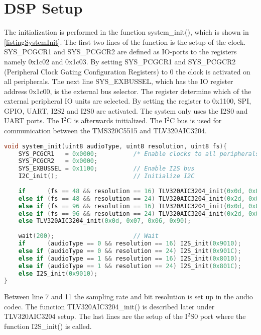 \chapter{DSP Setup} \label{app:DSPSetup}

The initialization is performed in the function system\_init(), which is shown in \autoref{listingSystemInit}. The first two lines of the function is the setup of the clock. SYS\_PCGCR1 and SYS\_PCGCR2 are defined as IO-ports to the registers namely 0x1c02 and 0x1c03. By setting SYS\_PCGCR1 and SYS\_PCGCR2 (Peripheral Clock Gating Configuration Registers) to 0 the clock is activated on all peripherals. The next line SYS\_EXBUSSEL, which has the IO register address 0x1c00, is the external bus selector. The register determine which of the external peripheral IO units are selected. By setting the register to 0x1100, SPI, GPIO, UART, I2S2 and I2S0 are activated. The system only uses the I2S0 and UART ports. The I$^2$C is afterwards initialized. The I$^2$C bus is used for communication between the TMS320C5515 and TLV320AIC3204.

\begin{lstlisting}[language=C, caption = {System initialization},label={listingSystemInit}]
void system_init(uint8 audioType, uint8 resolution, uint8 fs){
    SYS_PCGCR1 	 = 0x0000;     		/* Enable clocks to all peripherals */
    SYS_PCGCR2 	 = 0x0000;
	SYS_EXBUSSEL = 0x1100;         	// Enable I2S bus
	I2C_init();        				// Initialize I2C
	
	if 		(fs == 48 && resolution == 16) TLV320AIC3204_init(0x0d, 0x07, 0x06, 0x90);
	else if (fs == 48 && resolution == 24) TLV320AIC3204_init(0x2d, 0x07, 0x06, 0x90);	
	else if (fs == 96 && resolution == 16) TLV320AIC3204_init(0x0d, 0x0E, 0x0D, 0x20);	
	else if	(fs == 96 && resolution == 24) TLV320AIC3204_init(0x2d, 0x0E, 0x0D, 0x20);
	else TLV320AIC3204_init(0x0d, 0x07, 0x06, 0x90);	
	
	wait(200);        				// Wait	
	if 		(audioType == 0 && resolution == 16) I2S_init(0x9010);
	else if (audioType == 0 && resolution == 24) I2S_init(0x901C);	
	else if (audioType == 1 && resolution == 16) I2S_init(0x8010);	
	else if	(audioType == 1 && resolution == 24) I2S_init(0x801C);
	else I2S_init(0x9010);
}
\end{lstlisting}
Between line 7 and 11 the sampling rate and bit resolution is set up in the audio codec. The function TLV320AIC3204\_init() is described later under TLV320AIC3204 setup. The last lines are the setup of the I$^2$S0 port where the function I2S\_init() is called.

